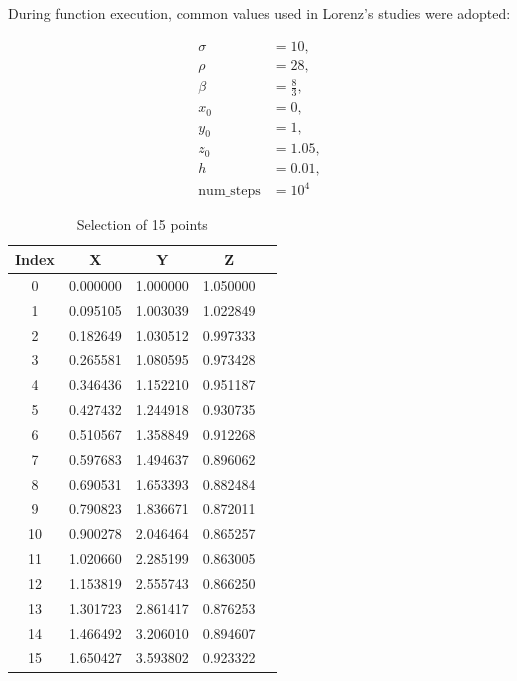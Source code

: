 \documentclass[12pt, a4paper]{article}
\begin{document}
	During function execution, common values used in Lorenz's studies were adopted:
	
	\begin{equation}
		\begin{aligned}
			\sigma            & = 10,          \\
			\rho              & = 28,          \\
			\beta             & = \frac{8}{3}, \\
			x_0               & = 0,           \\
			y_0               & = 1,           \\
			z_0               & = 1.05,        \\
			h                 & = 0.01,        \\
			\text{num\_steps} & = 10^4         
		\end{aligned}
	\end{equation}
	
	\begin{table}[H]
		\centering
		\begin{tabular}{|c|c|c|c|c|}
			\hline
			Index & X        & Y        & Z        \\
			\hline
			0     & 0.000000 & 1.000000 & 1.050000 \\
			1     & 0.095105 & 1.003039 & 1.022849 \\
			2     & 0.182649 & 1.030512 & 0.997333 \\
			3     & 0.265581 & 1.080595 & 0.973428 \\
			4     & 0.346436 & 1.152210 & 0.951187 \\
			5     & 0.427432 & 1.244918 & 0.930735 \\
			6     & 0.510567 & 1.358849 & 0.912268 \\
			7     & 0.597683 & 1.494637 & 0.896062 \\
			8     & 0.690531 & 1.653393 & 0.882484 \\
			9     & 0.790823 & 1.836671 & 0.872011 \\
			10    & 0.900278 & 2.046464 & 0.865257 \\
			11    & 1.020660 & 2.285199 & 0.863005 \\
			12    & 1.153819 & 2.555743 & 0.866250 \\
			13    & 1.301723 & 2.861417 & 0.876253 \\
			14    & 1.466492 & 3.206010 & 0.894607 \\
			15    & 1.650427 & 3.593802 & 0.923322 \\
			\hline
		\end{tabular}
		\caption{Selection of 15 points}
	\end{table}
	
\end{document}
